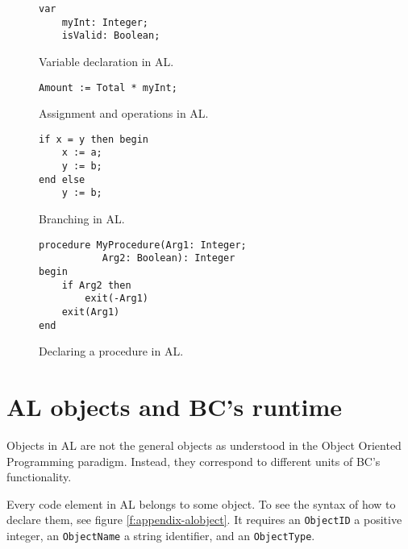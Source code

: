 \begin{figure}
    \begin{minipage}{.45\textwidth}
        \begin{Verbatim}[fontsize=\small]
var
    myInt: Integer;
    isValid: Boolean;
        \end{Verbatim}
        \parbox{0.9\textwidth}{\caption{Variable declaration in AL.}}
        \label{fig:al-var-decl}
    \end{minipage}%
    \begin{minipage}{.45\textwidth}
        \begin{Verbatim}[fontsize=\small]
Amount := Total * myInt;
        \end{Verbatim}
        \caption{Assignment and operations in AL.}
    \end{minipage}
\end{figure}

\begin{figure}
    \begin{minipage}{.45\textwidth}
        \begin{Verbatim}[fontsize=\small]
if x = y then begin  
    x := a;  
    y := b;  
end else 
    y := b;   
        \end{Verbatim}
        \parbox{0.9\textwidth}{\caption{Branching in AL.}}
    \end{minipage}%
    \begin{minipage}{.45\textwidth}
        \begin{Verbatim}[fontsize=\small]
procedure MyProcedure(Arg1: Integer; 
           Arg2: Boolean): Integer
begin
    if Arg2 then
        exit(-Arg1)
    exit(Arg1)
end
        \end{Verbatim}
        \parbox{0.9\textwidth}{\caption{Declaring a procedure in AL.}}
        \label{fig:al-proc-decl}
    \end{minipage}%

\end{figure}

\section{AL objects and BC's runtime}
Objects in AL are not the general objects as understood in the Object Oriented Programming paradigm. Instead,
they correspond to different units of BC's functionality.

Every code element in AL belongs to some object. To see the syntax of how to declare them, see figure \ref{f:appendix-alobject}.
It requires an \texttt{ObjectID} a positive integer, an \texttt{ObjectName} a string identifier, and an \texttt{ObjectType}.


